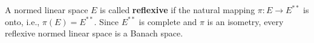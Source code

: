 A normed linear space $E$ is called \textbf{reflexive} if the natural mapping $\pi: E \to E^{**}$ is onto, i.e., $\pi(E) = E^{**}$. Since $E^{**}$ is complete and $\pi$ is an isometry, every reflexive normed linear space is a Banach space.

